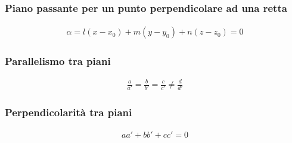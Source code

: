 \documentclass[a4paper]{article}
\begin{document}
	\subsubsection*{Piano passante per un punto perpendicolare ad una retta}
	
	\begin{align*}
		\alpha = l(x-x_0)+m(y-y_0)+n(z-z_0)=0
	\end{align*}
	
	\subsubsection*{Parallelismo tra piani}
	\begin{align*}
		\frac{a}{a'} = \frac{b}{b'} = \frac{c}{c'} \ne \frac{d}{d'}
	\end{align*}
	
	\subsubsection*{Perpendicolarità tra piani}
	\begin{align*}
		aa'+bb'+cc'=0
	\end{align*}
	
	\newpage
\end{document}
